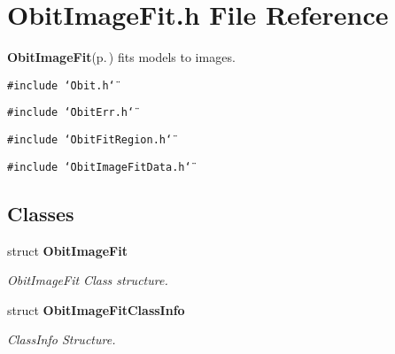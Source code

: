 \section{Obit\-Image\-Fit.h File Reference}
\label{ObitImageFit_8h}
{\bf Obit\-Image\-Fit}{\rm (p.\,\pageref{structObitImageFit})} fits models to images. 

{\tt \#include \char`\"{}Obit.h\char`\"{}}\par
{\tt \#include \char`\"{}Obit\-Err.h\char`\"{}}\par
{\tt \#include \char`\"{}Obit\-Fit\-Region.h\char`\"{}}\par
{\tt \#include \char`\"{}Obit\-Image\-Fit\-Data.h\char`\"{}}\par
\subsection*{Classes}
\begin{CompactItemize}
\item 
struct {\bf Obit\-Image\-Fit}
\begin{CompactList}\small\item\em Obit\-Image\-Fit Class structure. \item\end{CompactList}\item 
struct {\bf Obit\-Image\-Fit\-Class\-Info}
\begin{CompactList}\small\item\em Class\-Info Structure. \item\end{CompactList}\end{CompactItemize}
